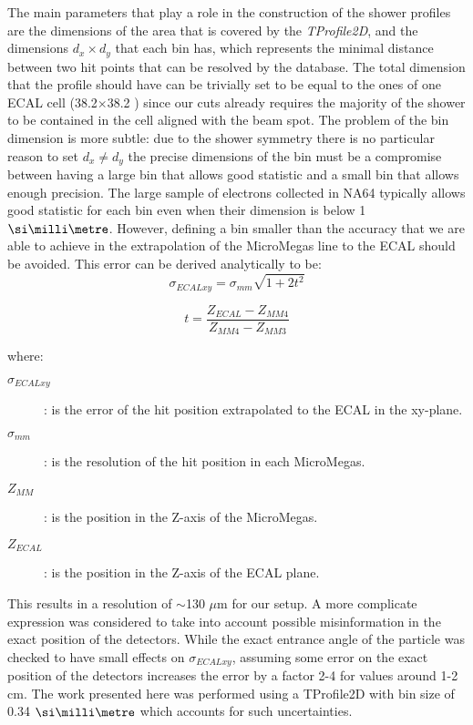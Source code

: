 The main parameters that play a role in the construction of the shower
profiles are the dimensions of the area that is covered by the
\textit{TProfile2D}, and the dimensions $d_x \times d_y$ that each bin has,
which represents the minimal distance between two hit points that can
be resolved by the database.  The total dimension that the profile
should have can be trivially set to be equal to the ones of one ECAL
cell (38.2$\times$38.2 \mms) since our cuts
already requires the majority of the shower to be contained in the
cell aligned with the beam spot. The problem of the bin dimension is
more subtle: due to the shower symmetry there is no particular reason
to set $d_x \neq d_y$ the precise dimensions of the bin must be a
compromise between having a large bin that allows good statistic and a
small bin that allows enough precision. The large sample of electrons
collected in NA64 typically allows good statistic for each bin even
when their dimension is below 1 $\mmi$. However, defining a bin smaller
than the accuracy that we are able to achieve in the extrapolation of
the MicroMegas line to the ECAL should be avoided. This error can be
derived analytically to be:
\begin{equation}
  \sigma_{ECALxy} = \sigma_{mm}\sqrt{1+2t^2}
  \label{eqn:MMerror}
\end{equation}

\begin{equation}
  t = \frac{Z_{ECAL}-Z_{MM4}}{Z_{MM4}-Z_{MM3}}
  \label{eqn:T}
\end{equation}

where:
\begin{description}
\item[$\sigma_{ECALxy}$]: is the error of the hit position
  extrapolated to the ECAL in the xy-plane.
\item[$\sigma_{mm}$]: is the resolution of the hit position in each
  MicroMegas.
\item[$Z_{MM}$]: is the position in the Z-axis of the MicroMegas.
\item[$Z_{ECAL}$]: is the position in the Z-axis of the ECAL plane.
\end{description}


This results in a resolution of $\sim$130 $\mu$m for our setup. A more
complicate expression was considered to take into account possible
misinformation in the exact position of the detectors. While the exact
entrance angle of the particle was checked to have small effects on
$\sigma_{ECALxy}$, assuming some error on the exact position of the
detectors increases the error by a factor 2-4 for values around 1-2
\si{\centi\meter}. The work presented here was performed using a TProfile2D
with bin size of 0.34 $\mmi$ which accounts for such uncertainties.

